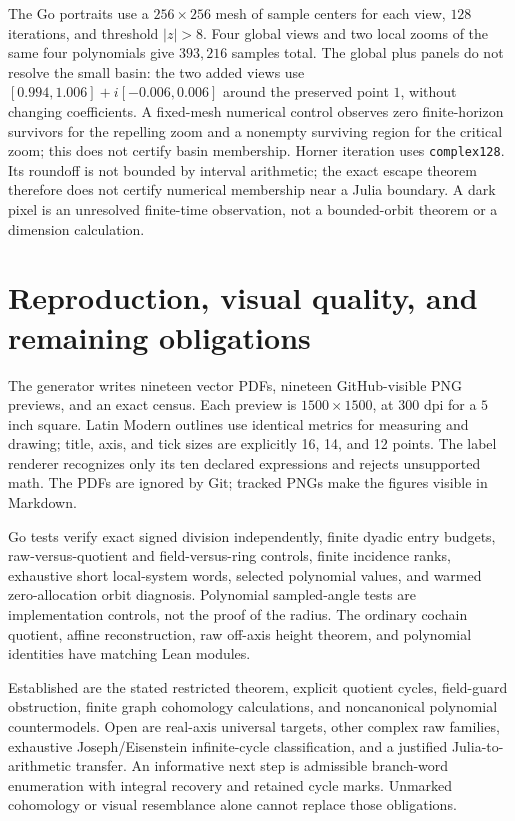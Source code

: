 \documentclass[11pt,letterpaper]{article}
\begin{document}
The Go portraits use a \(256\times256\) mesh of sample centers for each view, \(128\) iterations, and threshold \(|z|>8\). Four global views and two local zooms of the same four polynomials give \(393,216\) samples total. The global plus panels do not resolve the small basin: the two added views use \([0.994,1.006]+i[-0.006,0.006]\) around the preserved point \(1\), without changing coefficients. A fixed-mesh numerical control observes zero finite-horizon survivors for the repelling zoom and a nonempty surviving region for the critical zoom; this does not certify basin membership. Horner iteration uses \texttt{complex128}. Its roundoff is not bounded by interval arithmetic; the exact escape theorem therefore does not certify numerical membership near a Julia boundary. A dark pixel is an unresolved finite-time observation, not a bounded-orbit theorem or a dimension calculation.

\section{Reproduction, visual quality, and remaining obligations}

The generator writes nineteen vector PDFs, nineteen GitHub-visible PNG previews, and an exact census. Each preview is \(1500\times1500\), at 300 dpi for a \(5\) inch square. Latin Modern outlines use identical metrics for measuring and drawing; title, axis, and tick sizes are explicitly 16, 14, and 12 points. The label renderer recognizes only its ten declared expressions and rejects unsupported math. The PDFs are ignored by Git; tracked PNGs make the figures visible in Markdown.

Go tests verify exact signed division independently, finite dyadic entry budgets, raw-versus-quotient and field-versus-ring controls, finite incidence ranks, exhaustive short local-system words, selected polynomial values, and warmed zero-allocation orbit diagnosis. Polynomial sampled-angle tests are implementation controls, not the proof of the radius. The ordinary cochain quotient, affine reconstruction, raw off-axis height theorem, and polynomial identities have matching Lean modules.

Established are the stated restricted theorem, explicit quotient cycles, field-guard obstruction, finite graph cohomology calculations, and noncanonical polynomial countermodels. Open are real-axis universal targets, other complex raw families, exhaustive Joseph/Eisenstein infinite-cycle classification, and a justified Julia-to-arithmetic transfer. An informative next step is admissible branch-word enumeration with integral recovery and retained cycle marks. Unmarked cohomology or visual resemblance alone cannot replace those obligations.



\end{document}
